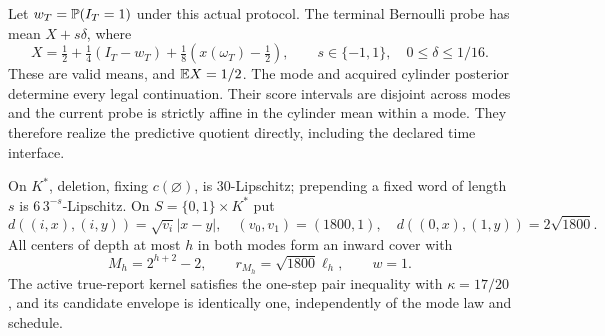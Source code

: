 Let $w_T=\mathbb P(I_T=1)$ under this actual protocol. The terminal Bernoulli probe has mean $X+s\delta$, where
\begin{equation}\label{eq:singulartask}
 X=\tfrac12+\tfrac14(I_T-w_T)+\tfrac18(x(\omega_T)-\tfrac12),
 \qquad s\in\{-1,1\},\quad0\le\delta\le1/16.
\end{equation}
These are valid means, and $\mathbb E X=1/2$. The mode and acquired cylinder posterior determine every legal continuation. Their score intervals are disjoint across modes and the current probe is strictly affine in the cylinder mean within a mode. They therefore realize the predictive quotient directly, including the declared time interface.

\begin{lemma}\label{lem:singularraw}
On $K^*$, deletion, fixing $c(\varnothing)$, is $30$-Lipschitz; prepending a fixed word of length $s$ is $6\,3^{-s}$-Lipschitz. On $S=\{0,1\}\times K^*$ put
\[
 d((i,x),(i,y))=\sqrt{v_i}|x-y|,
 \quad (v_0,v_1)=(1800,1),
 \quad d((0,x),(1,y))=2\sqrt{1800}.
\]
All centers of depth at most $h$ in both modes form an inward cover with
\[
 M_h=2^{h+2}-2,\qquad r_{M_h}=\sqrt{1800}\ell_h,\qquad w=1.
\]
The active true-report kernel satisfies the one-step pair inequality with $\kappa=17/20$, and its candidate envelope is identically one, independently of the mode law and schedule.
\end{lemma}
